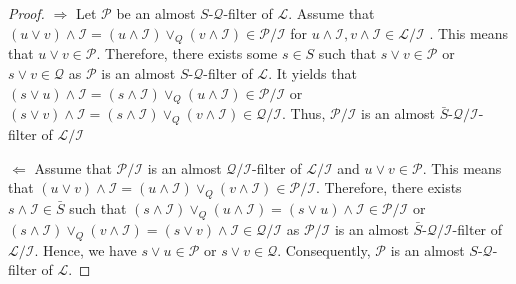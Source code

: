 \documentclass[preprint,review,10pt]{amsart}
\theoremstyle{definition}
\theoremstyle{remark}
\numberwithin{equation}{section}
\begin{document}
\begin{proof}
$\Longrightarrow$ Let $ \mathcal{P}$ be an almost $S$-$\mathcal{Q}$-filter of $\mathcal{L}$. Assume  that $(u \vee v) \wedge \mathcal{I}=(u \wedge \mathcal{I})\vee_Q (v \wedge \mathcal{I})  \in \mathcal{P}/ \mathcal{I}$ for $u \wedge \mathcal{I} , v \wedge \mathcal{I} \in \mathcal{L}/ \mathcal{I}$ .  This means that  $u \vee v \in  \mathcal{P}$. Therefore, there exists some $s \in S$ such that   $s \vee v \in \mathcal{P}$ or $s \vee v \in \mathcal{Q}$ as $ \mathcal{P}$ is  an almost $S$-$\mathcal{Q}$-filter of $\mathcal{L}$. It yields that  $(s \vee u)\wedge \mathcal{I}=(s \wedge \mathcal{I})\vee_Q (u \wedge \mathcal{I}) \in \mathcal{P}/ \mathcal{I}$ or $(s \vee v)\wedge \mathcal{I}=(s \wedge \mathcal{I})\vee_Q (v \wedge \mathcal{I}) \in \mathcal{Q}/ \mathcal{I}$. Thus, $\mathcal{P}/ \mathcal{I}$ is an almost $\bar{S}$-$\mathcal{Q}/ \mathcal{I}$-filter of $\mathcal{L}/ \mathcal{I}$ 

$\Longleftarrow$ Assume that $\mathcal{P}/ \mathcal{I}$ is an almost  $\mathcal{Q}/ \mathcal{I}$-filter of $\mathcal{L}/ \mathcal{I}$ and $u \vee v \in \mathcal{P}$. This means that  $(u \vee v)  \wedge \mathcal{I} =(u  \wedge \mathcal{I})  \vee_Q (v  \wedge \mathcal{I}) \in \mathcal{P}/ \mathcal{I}$. Therefore,    there exists $s  \wedge \mathcal{I} \in \bar{S}$ such that $(s \wedge \mathcal{I}) \vee_Q (u\wedge \mathcal{I})=(s \vee u)\wedge \mathcal{I} \in \mathcal{P}/ \mathcal{I}$ or $(s \wedge \mathcal{I}) \vee_Q (v\wedge \mathcal{I})=(s \vee v)\wedge \mathcal{I} \in \mathcal{Q}/ \mathcal{I}$ as $\mathcal{P}/ \mathcal{I}$ is an almost $\bar{S}$-$\mathcal{Q}/ \mathcal{I}$-filter of $\mathcal{L}/ \mathcal{I}$. Hence,  we have  $s \vee u \in \mathcal{P}$ or $s \vee v \in \mathcal{Q}$. Consequently, $ \mathcal{P}$ is an  almost $S$-$\mathcal{Q}$-filter of $\mathcal{L}$.
\end{proof}
\end{document}
